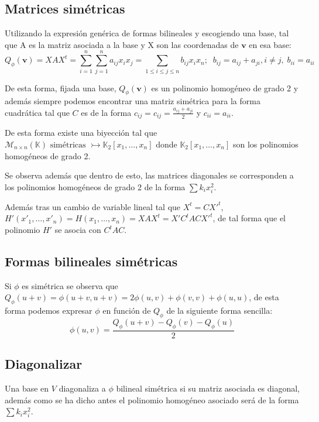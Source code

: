 \documentclass{preset}
\begin{document}
\vspace{-25pt}
\subsection{Matrices simétricas}
Utilizando la expresión genérica de formas bilineales y escogiendo una base, tal que A es la matriz asociada a la base y X son las coordenadas de $\textbf{v}$ en esa base:
\vspace{-10pt}
\[Q_\phi(\textbf{v})=XAX^t=\sum_{i=1}^n{\sum_{j=1}^n {a_{ij} x_i x_j}}=\sum_{1\leq i\leq j \leq n}{b_{ij} x_i x_n}; \;\; b_{ij} = a_{ij}+a_{ji}, i\neq j, \; b_{ii} = a_{ii}\]

\vspace{-10pt}
De esta forma, fijada una base, $Q_\phi(\textbf{v})$ es un polinomio homogéneo de grado 2 y además siempre podemos encontrar una matriz simétrica para la forma cuadrática tal que $C$ es de la forma $c_{ij} = c_{ij}= \frac{a_{ij}+a_{ji}}{2}$ y $c_{ii}=a_{ii}$.

De esta forma existe una biyección tal que $\mathcal{M}_{n\times n}(\mathbb{K}) \mbox{ simétricas } \rightarrowtail  \mathbb{K}_2[x_1,\dots,x_n]$ donde $\mathbb{K}_2[x_1,\dots,x_n]$ son los polinomios homogéneos de grado 2.

Se observa además que dentro de esto, las matrices diagonales se corresponden a los polinomios homogéneos de grado 2 de la forma $\sum k_i x_i^2$.

Además tras un cambio de variable lineal tal que $X^t=CX'^t$, $H'(x'_1,\dots,x'_n)=H(x_1,\dots,x_n)=XAX^t=X' C^t A C X'^t$, de tal forma que el polinomio $H'$ se asocia con $C^t A C$.
\vspace{-15pt}
\subsection{Formas bilineales simétricas}
Si $\phi$ es simétrica se observa que $Q_\phi(u+v)=\phi(u+v,u+v)=2\phi(u,v)+\phi(v,v)+\phi(u,u)$, de esta forma podemos expresar $\phi$ en función de $Q_\phi$ de la siguiente forma sencilla:
\vspace{-5pt}
\[\phi(u,v)=\frac{Q_\phi(u+v)-Q_\phi(v)-Q_\phi(u)}{2}\]

\vspace{-15pt}
\subsection{Diagonalizar}
Una base en $V$ diagonaliza a $\phi$ bilineal simétrica si su matriz asociada es diagonal, además como se ha dicho antes el polinomio homogéneo asociado será de la forma $\sum k_i x_i^2$.
\end{document}
